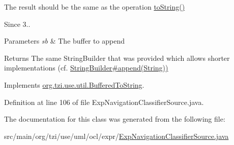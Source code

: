 The result should be the same as the operation \hyperlink{classorg_1_1tzi_1_1use_1_1uml_1_1ocl_1_1expr_1_1_expression_a01192513b1b1adbc44727a67ae14d02e}{to\-String()} 

\begin{DoxySince}{Since}
3.. 
\end{DoxySince}

\begin{DoxyParams}{Parameters}
{\em sb} & The buffer to append \\
\hline
\end{DoxyParams}
\begin{DoxyReturn}{Returns}
The same String\-Builder that was provided which allows shorter implementations (cf. \hyperlink{}{String\-Builder\#append(\-String))} 
\end{DoxyReturn}


Implements \hyperlink{interfaceorg_1_1tzi_1_1use_1_1util_1_1_buffered_to_string_aea95e4e53b18818d50ee253700e6e2d5}{org.\-tzi.\-use.\-util.\-Buffered\-To\-String}.



Definition at line 106 of file Exp\-Navigation\-Classifier\-Source.\-java.



The documentation for this class was generated from the following file\-:\begin{DoxyCompactItemize}
\item 
src/main/org/tzi/use/uml/ocl/expr/\hyperlink{_exp_navigation_classifier_source_8java}{Exp\-Navigation\-Classifier\-Source.\-java}\end{DoxyCompactItemize}
